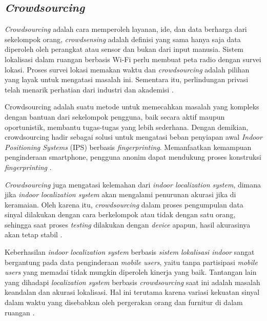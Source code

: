 \subsection{\textit{Crowdsourcing}}
\textit{Crowdsourcing} adalah cara memperoleh layanan, ide, dan data berharga dari sekelompok orang, \textit{crowdsensing} adalah definisi yang sama hanya saja data diperoleh oleh perangkat atau sensor dan bukan dari input manusia. Sistem lokalisasi dalam ruangan berbasis Wi-Fi perlu membuat peta radio dengan survei lokasi. Proses survei lokasi memakan waktu dan \textit{crowdsourcing} adalah pilihan yang layak untuk mengatasi masalah ini. Sementara itu, perlindungan privasi telah menarik perhatian dari industri dan akademisi \citep{Li2018}.

\par Crowdsourcing adalah suatu metode untuk  memecahkan masalah yang kompleks dengan bantuan dari sekelompok pengguna, baik secara aktif maupun oportunistik, membantu tugas-tugas yang lebih sederhana. Dengan demikian, crowdsourcing hadir  sebagai solusi untuk mengatasi beban penyiapan awal \textit{Indoor Positioning Systems} (IPS) berbasis \textit{fingerprinting}. Memanfaatkan kemampuan penginderaan smartphone, pengguna anonim dapat mendukung proses konstruksi \textit{fingerprinting} \citep{Santos2021}.

\par \textit{Crowdsourcing} juga mengatasi kelemahan dari \textit{indoor localization system}, dimana jika \textit{indoor localization system} akan mengalami penurunan akurasi jika di keramaian. Oleh karena itu, \textit{crowdsourcing} dalam proses pengumpulan data sinyal dilakukan dengan cara berkelompok atau tidak dengan satu orang, sehingga saat proses \textit{testing} dilakukan dengan \textit{device} apapun, hasil akurasinya akan tetap stabil \citep{Li2018}.

\par Keberhasilan \textit{indoor localization system} berbasis \textit{sistem lokalisasi indoor} sangat bergantung pada data penginderaan \textit{mobile users}, yaitu  tanpa partisipasi \textit{mobile users} yang memadai tidak mungkin diperoleh kinerja yang baik. Tantangan lain yang dihadapi \textit{localization system} berbasis \textit{crowdsourcing} saat ini adalah masalah keandalan dan akurasi lokalisasi. Hal ini terutama karena variasi kekuatan sinyal dalam waktu yang disebabkan oleh pergerakan orang dan furnitur di dalam ruangan \citep{Sun2019}.



